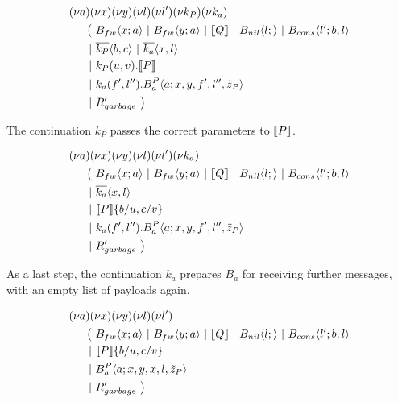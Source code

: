 \begin{align*}
  &\anew{a}{\anew{x}{\anew{y}{\anew{l}{\anew{l'}{\anew{k_P}{\anew{k_a}{ \\
    &\hspace{0.5cm}
    \begin{aligned}[t]
      \big(\ &\ains{B_{fw}}{x}{a}
      \apar   \ains{B_{fw}}{y}{a}
      \apar   \encMJtoAP{Q}
      \apar   \ains{B_{nil}}{l}{}
      \apar   \ains{B_{cons}}{l'}{b, l}
      \\
      \apar  &\asnd{k_P}{b,c}
      \apar   \asnd{k_a}{x,l}
      \\
      \apar  &\arcv{k_P}{u,v} . \encMJtoAP{P}
      \\
      \apar  &\arcv{k_a}{f',l''} . \ains{B_a^P}{a}{x, y, f', l'',\tilde{z}_P}
      \\
      \apar  &R_{garbage}'
      \ \big)
    \end{aligned}
  }}}}}}}
\end{align*}

The continuation $k_P$ passes the correct parameters to $\llbracket P \rrbracket$.

\begin{align*}
  &\anew{a}{\anew{x}{\anew{y}{\anew{l}{\anew{l'}{\anew{k_a}{ \\
    &\hspace{0.5cm}
    \begin{aligned}[t]
      \big(\ &\ains{B_{fw}}{x}{a}
      \apar   \ains{B_{fw}}{y}{a}
      \apar   \encMJtoAP{Q}
      \apar   \ains{B_{nil}}{l}{}
      \apar   \ains{B_{cons}}{l'}{b, l}
      \\
      \apar  &\asnd{k_a}{x,l}
      \\
      \apar  &\encMJtoAP{P}\substitution{\subst{b}{u},\subst{c}{v}}
      \\
      \apar  &\arcv{k_a}{f',l''} . \ains{B_a^P}{a}{x, y, f', l'',\tilde{z}_P}
      \\
      \apar  &R_{garbage}'
      \ \big)
    \end{aligned}
  }}}}}}
\end{align*}

As a last step, the continuation $k_a$ prepares $B_a$ for receiving further
messages, with an empty list of payloads again.

\begin{align*}
  &\anew{a}{\anew{x}{\anew{y}{\anew{l}{\anew{l'}{ \\
    &\hspace{0.5cm}
    \begin{aligned}[t]
      \big(\ &\ains{B_{fw}}{x}{a}
      \apar   \ains{B_{fw}}{y}{a}
      \apar   \encMJtoAP{Q}
      \apar   \ains{B_{nil}}{l}{}
      \apar   \ains{B_{cons}}{l'}{b, l}
      \\
      \apar  &\encMJtoAP{P}\substitution{\subst{b}{u},\subst{c}{v}}
      \\
      \apar  &\ains{B_a^P}{a}{x, y, x, l,\tilde{z}_P}
      \\
      \apar  &R_{garbage}'
      \ \big)
    \end{aligned}
  }}}}}
\end{align*}

